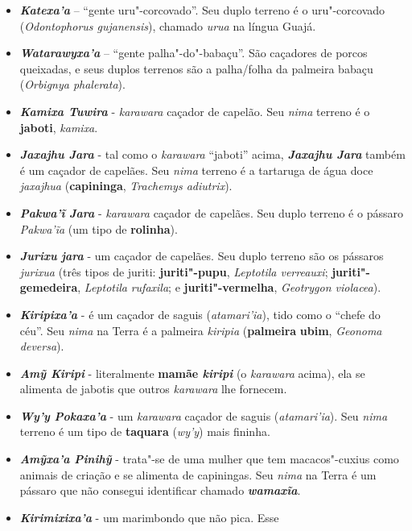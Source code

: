 \begin{itemize}
\item
  \emph{\textbf{Katexa'a}} -- ``gente uru"-corcovado''. Seu duplo terreno
  é o uru"-corcovado (\emph{Odontophorus gujanensis}), chamado
  \emph{urua} na língua Guajá.
\item
  \emph{\textbf{Watarawyxa'a}} -- ``gente palha"-do"-babaçu''. São
  caçadores de porcos queixadas, e seus duplos terrenos são a
  palha/folha da palmeira babaçu (\emph{Orbignya phalerata}).
\item
  \textbf{\emph{Kamixa Tuwira}} - \emph{karawara} caçador de capelão.
  Seu \emph{nima} terreno é o \textbf{jaboti}, \emph{kamixa}.
\item
  \emph{\textbf{Jaxajhu Jara}} - tal como o \emph{karawara} ``jaboti''
  acima, \emph{\textbf{Jaxajhu Jara}} também é um caçador de capelães.
  Seu \emph{nima} terreno é a tartaruga de água doce \emph{jaxajhua}
  (\textbf{capininga}, \emph{Trachemys adiutrix}).
\item
  \textbf{\emph{Pakwa'ĩ} \emph{Jara}} - \emph{karawara} caçador de
  capelães. Seu duplo terreno é o pássaro \emph{Pakwa'ĩa} (um tipo de
  \textbf{rolinha}).
\item
  \textbf{\emph{Jurixu} \emph{jara}} - um caçador de capelães. Seu duplo
  terreno são os pássaros \emph{jurixua} (três tipos de juriti:
  \textbf{juriti"-pupu}, \emph{Leptotila verreauxi};
  \textbf{juriti"-gemedeira}, \emph{Leptotila} \emph{rufaxila}; e
  \textbf{juriti"-vermelha}, \emph{Geotrygon violacea}).
\item
  \emph{\textbf{Kiripixa'a}} - é um caçador de saguis
  (\emph{atamari'ia}), tido como o ``chefe do céu''. Seu \emph{nima} na
  Terra é a palmeira \emph{kiripia} (\textbf{palmeira} \textbf{ubim},
  \emph{Geonoma deversa}).
\item
  \emph{\textbf{Amỹ Kiripi}} - literalmente \textbf{mamãe \emph{kiripi}}
  (o \emph{karawara} acima), ela se alimenta de jabotis que outros
  \emph{karawara} lhe fornecem.
\item
  \emph{\textbf{Wy'y Pokaxa'a}} - um \emph{karawara} caçador de saguis
  (\emph{atamari'ia}). Seu \emph{nima} terreno é um tipo de
  \textbf{taquara} (\emph{wy'y}) mais fininha.
\item
  \emph{\textbf{Amỹxa'a Pinihỹ}} - trata"-se de uma mulher que tem
  macacos"-cuxius como animais de criação e se alimenta de capiningas.
  Seu \emph{nima} na Terra é um pássaro que não consegui identificar
  chamado \emph{\textbf{wamaxĩa}}.
\item
  \emph{\textbf{Kirimixixa'a}} - um marimbondo que não pica. Esse

\end{itemize}
